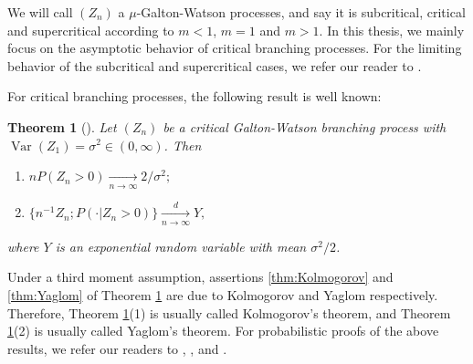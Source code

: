 \documentclass[UTF8]{pkuthss}
\theoremstyle{plain}
\newtheorem{thm}{Theorem}[section]
\theoremstyle{definition}
\numberwithin{equation}{section}
\begin{document}
	We will call $(Z_n)$ a $\mu$-Galton-Watson processes, and say it is subcritical, critical and supercritical according to $m < 1$, $m = 1$ and $m >1$. 
	In this thesis, we mainly focus on the asymptotic behavior of critical branching processes. 
	For the limiting behavior of the subcritical and supercritical cases, we refer our reader to \cite{AthreyaNey1972Branching}.

	For critical branching processes, the following result is well known:
\begin{thm}[\cite{KestenNeySpitzer1966The-Galton-Watson}] 
\label{thm: Kolmogorov and Yaglom theorem}
	Let $(Z_n)$ be a critical Galton-Watson branching process with $\operatorname{Var}(Z_1) = \sigma^2 \in (0,\infty)$. Then
	\begin{enumerate}
		\item \label{thm:Kolmogorov} 
		$n P (Z_n>0) \xrightarrow[n \to \infty]{} 2/\sigma^2;$
		\item \label{thm:Yaglom}
		$\{n^{-1}Z_n; P(\cdot | Z_n>0)\}\xrightarrow[n \to \infty]{d} Y,$
	\end{enumerate}
	where $Y$ is an exponential random variable with mean $\sigma^2/2$.
\end{thm}

\begin{comment}
\begin{thm}
\label{thm: Kolmogorov and Yaglom theorem}
	Let $(Z_n)$ be a critical Galton-Watson branching process with $\operatorname{Var}(Z_1) = 2c \in (0,\infty)$. Then 
\begin{itemize}
\item[(1)]
	$n P(Z_n > 0)\xrightarrow[n\to \infty]{} c^{-1}$,
\item[(2)]
	$P_1(n^{-1}Z_n > r|Z_n >0) \xrightarrow[n\to \infty]{} e^{-r/c}, \quad r\geq 0$.
\end{itemize}
\end{thm}
\end{comment}
	Under a third moment assumption, assertions \eqref{thm:Kolmogorov} and \eqref{thm:Yaglom} of Theorem \ref{thm: Kolmogorov and Yaglom theorem} are due to Kolmogorov \cite{Kolmogorov1938Zur-losung} and Yaglom \cite{Yaglom1947Certain} respectively.
	Therefore, Theorem \ref{thm: Kolmogorov and Yaglom theorem}(1) is usually called Kolmogorov's theorem, and Theorem \ref{thm: Kolmogorov and Yaglom theorem}(2) is usually called Yaglom's theorem.
	For probabilistic proofs of the above results, we refer our readers to \cite{Geiger1999Elementary}, \cite{Geiger2000A-new}, \cite{LyonsPemantlePeres1995Conceptual} and \cite{RenSongSun2018A-2-spine}. 
\end{document}
